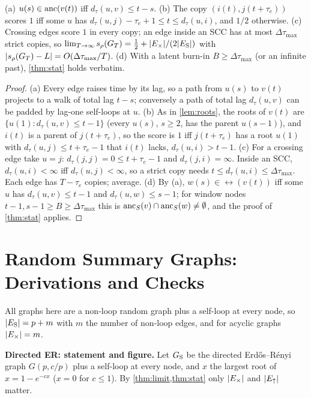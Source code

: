 \begin{proposition}\label{prop:lags}
(a) $u(s)\in\mathrm{anc}(v(t))$ iff $d_\tau(u,v)\le t-s$. (b) The copy
$(i(t),j(t{+}\tau_e))$ scores $1$ iff some $u$ has
$d_\tau(u,j)-\tau_e+1\le t\le d_\tau(u,i)$, and $1/2$ otherwise. (c) Crossing
edges score $1$ in every copy; an edge inside an SCC has at most
$\Delta\tau_{\max}$ strict copies, so
$\lim_{T\to\infty}s_\rho(G_T)=\tfrac12+|E_{\times}|/(2|E_{\mathrm S}|)$ with $|s_\rho(G_T)-L|=O(\Delta\tau_{\max}/T)$.
(d) With a latent burn-in $B\ge\Delta\tau_{\max}$ (or an infinite past),
\cref{thm:stat} holds verbatim.
\end{proposition}
\begin{proof}
(a) Every edge raises time by its lag, so a path from $u(s)$ to $v(t)$ projects
to a walk of total lag $t-s$; conversely a path of total lag $d_\tau(u,v)$ can be
padded by lag-one self-loops at $u$. (b) As in \cref{lem:roots}, the roots of
$v(t)$ are $\{u(1):d_\tau(u,v)\le t-1\}$ (every $u(s)$, $s\ge2$, has the parent
$u(s-1)$), and $i(t)$ is a parent of $j(t{+}\tau_e)$, so the score is $1$ iff
$j(t{+}\tau_e)$ has a root $u(1)$ with $d_\tau(u,j)\le t+\tau_e-1$ that $i(t)$
lacks, $d_\tau(u,i)>t-1$. (c) For a crossing edge take $u=j$:
$d_\tau(j,j)=0\le t+\tau_e-1$ and $d_\tau(j,i)=\infty$. Inside an SCC,
$d_\tau(u,i)<\infty$ iff $d_\tau(u,j)<\infty$, so a strict copy needs
$t\le d_\tau(u,i)\le\Delta\tau_{\max}$. Each edge has $T-\tau_e$ copies; average.
(d) By (a), $w(s)\in\rel(v(t))$ iff some $u$ has $d_\tau(u,v)\le t-1$ and
$d_\tau(u,w)\le s-1$; for window nodes $t-1,s-1\ge B\ge\Delta\tau_{\max}$ this is
$\mathrm{anc}_S(v)\cap\mathrm{anc}_S(w)\ne\emptyset$, and the proof of \cref{thm:stat} applies.
\end{proof}

\section{Random Summary Graphs: Derivations and Checks}
\label{app:er}


All graphs here are a non-loop random graph plus a self-loop at every node, so
$|E_{\mathrm S}|=p+m$ with $m$ the number of non-loop edges, and for acyclic graphs
$|E_{\times}|=m$.

\textbf{Directed ER: statement and figure.}
Let $G_{\mathrm S}$ be the directed Erd\H{o}s--R\'enyi graph $G(p,c/p)$ plus a self-loop at
every node, and $x$ the largest root of $x=1-e^{-cx}$ ($x=0$ for $c\le1$). By
\cref{thm:limit,thm:stat} only $|E_{\times}|$ and $|E_{\uparrow}|$ matter.

